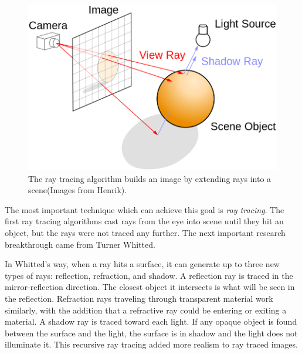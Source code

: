 \begin{figure}
\sidecaption
	\includegraphics[width=.65\textwidth]{graphics/df/Ray_trace_diagram}
	\caption{The ray tracing algorithm builds an image by extending rays into a scene(Images from Henrik).}
	\label{f:ray-tracing-diagram}
\end{figure}
	
The most important technique which can achieve this goal is \textit{ray tracing}. The first ray tracing algorithms cast rays from the eye into scene until they hit an object, but the rays were not traced any further. The next important research breakthrough came from Turner Whitted\cite{a:ray-tracing}.  

In Whitted's way, when a ray hits a surface, it can generate up to three new types of rays: reflection, refraction, and shadow. A reflection ray is traced in the mirror-reflection direction. The closest object it intersects is what will be seen in the reflection. Refraction rays traveling through transparent material work similarly, with the addition that a refractive ray could be entering or exiting a material. A shadow ray is traced toward each light. If any opaque object is found between the surface and the light, the surface is in shadow and the light does not illuminate it. This recursive ray tracing added more realism to ray traced images.

